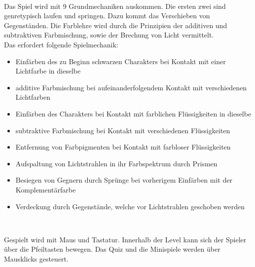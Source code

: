 \documentclass[10pt,a4paper,notitlepage]{report}
\begin{document}
	\\\par\medskip\Text
	Das Spiel wird mit 9 Grundmechaniken auskommen. Die ersten zwei sind genretypisch laufen und
	springen. Dazu kommt das Verschieben von Gegenständen. Die Farblehre wird durch die Prinzipien
	der additiven und subtraktiven Farbmischung, sowie der Brechung von Licht vermittelt.\\
	Das erfordert folgende Spielmechanik:
	\begin{itemize}
	\item Einfärben des zu Beginn schwarzen Charakters bei Kontakt mit einer Lichtfarbe in dieselbe
	\item additive Farbmischung bei aufeinanderfolgendem Kontakt mit verschiedenen Lichtfarben
	\item Einfärben des Charakters bei Kontakt mit farblichen Flüssigkeiten in dieselbe
	\item subtraktive Farbmischung bei Kontakt mit verschiedenen Flüssigkeiten
	\item Entfernung von Farbpigmenten bei Kontakt mit farbloser Flüssigkeiten
	\item Aufspaltung von Lichtstrahlen in ihr Farbspektrum durch Prismen
	\item Besiegen von Gegnern durch Sprünge bei vorherigem Einfärben mit der Komplementärfarbe
	\item Verdeckung durch Gegenstände, welche vor Lichtstrahlen geschoben werden
	\end{itemize}
	\par\smallskip
	
	\clearpage
	\marginpar{\vspace{3.0mm} \color{orange}\rule{0.8mm}{53.3mm} \\[3mm] \color{hellorange}\rule{0.8mm}{170mm}}
	\par\bigskip
	
	\\\par\medskip\Text
	Gespielt wird mit Maus und Tastatur.
	Innerhalb der Level kann sich der Spieler über die Pfeiltasten bewegen. Das Quiz und die Minispiele werden über Mausklicks gesteuert.\\\par\smallskip
	
\end{document}

